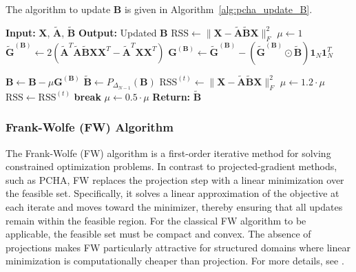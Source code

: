 \documentclass{article}
\begin{document}
The algorithm to update $\mathbf{B}$ is given in Algorithm~\ref{alg:pcha_update_B}.

\begin{algorithm}[H]
    \caption{Update $\mathbf{B}$ via Principal Convex Hull Analysis (PCHA)}
    \label{alg:pcha_update_B}
    \begin{algorithmic}[1]
        \State \textbf{Input:} $\mathbf{X}$, $\tilde{\mathbf{A}}$, $\tilde{\mathbf{B}}$
        \State \textbf{Output:} Updated $\mathbf{B}$
        \State $\text{RSS} \gets \| \mathbf{X} - \tilde{\mathbf{A}} \tilde{\mathbf{B}} \mathbf{X} \|_F^2$
        \State $\mu \gets 1$
                \State $\tilde{\mathbf{G}}^{(\mathbf{B})} \gets 2 \left( \tilde{\mathbf{A}}^T \tilde{\mathbf{A}} \tilde{\mathbf{B}} \mathbf{X} \mathbf{X}^T - \tilde{\mathbf{A}}^T \mathbf{X} \mathbf{X}^T \right)$
                \State $\mathbf{G}^{(\mathbf{B})} \gets \tilde{\mathbf{G}}^{(\mathbf{B})} - \left( \tilde{\mathbf{G}}^{(\mathbf{B})} \odot \tilde{\mathbf{B}} \right) \mathbf{1}_N \mathbf{1}_N^T$

             
                \State $\mathbf{B} \gets \mathbf{B} - \mu \mathbf{G}^{(\mathbf{B})}$
                \State $\tilde{\mathbf{B}} \gets P_{\Delta_{N-1}}(\mathbf{B})$
                \State $\text{RSS}^{(t)} \gets \| \mathbf{X} - \tilde{\mathbf{A}} \tilde{\mathbf{B}} \mathbf{X} \|_F^2$
                    \State $\mu \gets 1.2 \cdot \mu$
                    \State $\text{RSS} \gets \text{RSS}^{(t)}$
                    \State \textbf{break}
                \Else
                    \State $\mu \gets 0.5 \cdot \mu$
                \EndIf
                \EndFor
        \EndFor
    \State \textbf{Return:} $\tilde{\mathbf{B}}$
    \end{algorithmic}
\end{algorithm}

\subsubsection{Frank-Wolfe (FW) Algorithm}
\label{subsec:frank_wolfe}

The Frank-Wolfe (FW) algorithm is a first-order iterative method for solving constrained optimization problems. In contrast to projected-gradient methods, such as PCHA, FW replaces the projection step with a linear minimization over the feasible set. Specifically, it solves a linear approximation of the objective at each iterate and moves toward the minimizer, thereby ensuring that all updates remain within the feasible region. For the classical FW algorithm to be applicable, the feasible set must be compact and convex. The absence of projections makes FW particularly attractive for structured domains where linear minimization is computationally cheaper than projection. For more details, see \autocite{frankAlgorithmQuadraticProgramming1956a, clarksonCoresetsSparseGreedy2010, jaggiRevisitingFrankWolfeProjectionFree2013, bauckhageArchetypalAnalysisAutoencoder2015}.
\end{document}
